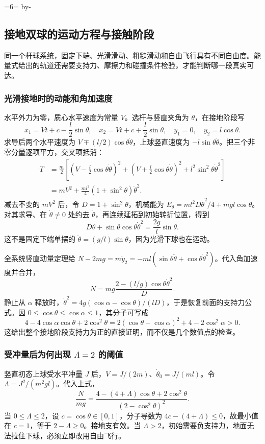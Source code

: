 \documentclass[UTF8,zihao=-4,fontset=fandol,a4paper]{ctexart}
\makeatletter
\newcommand{\Needspace}[1]{\par\if@nobreak\else\penalty0\begingroup\dimen0=#1\relax\dimen2=\pagegoal\advance\dimen2 by-\pagetotal\ifdim\dimen0>\dimen2\newpage\fi\endgroup\fi}
\let\SavedSubsection\subsection
\renewcommand{\subsection}{\Needspace{6\baselineskip}\SavedSubsection}
\makeatother
\begin{document}
\subsection{接地双球的运动方程与接触阶段}\label{sub:c2-4.7}\label{topic:contactdetail}
同一个杆球系统，固定下端、光滑滑动、粗糙滑动和自由飞行具有不同自由度。能量式给出的轨道还需要支持力、摩擦力和碰撞条件检验，才能判断哪一段真实可达。

\subsubsection*{光滑接地时的动能和角加速度}
水平外力为零，质心水平速度为常量 $V$。选杆与竖直夹角为 $\theta$，在接地阶段写
\[
x_1=Vt+c-\frac l2\sin\theta,\quad
x_2=Vt+c+\frac l2\sin\theta,\quad
y_1=0,\quad y_2=l\cos\theta.
\]
求导后两个水平速度为 $V\mp(l/2)\cos\theta\dot\theta$，上球竖直速度为 $-l\sin\theta\dot\theta$。把三个非零分量逐项平方，交叉项抵消：
\begin{align*}
T&=\frac m2\left[(V-\tfrac l2\cos\theta\dot\theta)^2
+(V+\tfrac l2\cos\theta\dot\theta)^2
+l^2\sin^2\theta\dot\theta^2\right]\\
&=mV^2+\frac{ml^2}{4}(1+\sin^2\theta)\dot\theta^2.
\end{align*}
减去不变的 $mV^2$ 后，令 $D=1+\sin^2\theta$，机械能为
$E_\theta=ml^2D\dot\theta^2/4+mgl\cos\theta$。对其求导、在 $\dot\theta\ne0$ 处约去 $\dot\theta$，再连续延拓到初始转折位置，得到
\[
D\ddot\theta+\sin\theta\cos\theta\dot\theta^2
=\frac{2g}{l}\sin\theta.
\]
这不是固定下端单摆的 $\ddot\theta=(g/l)\sin\theta$，因为光滑下球也在运动。

全系统竖直动量定理给
$N-2mg=m\ddot y_2=-ml(\sin\theta\ddot\theta+\cos\theta\dot\theta^2)$。代入角加速度并合并，
\[
N=mg\frac{2-(l/g)\cos\theta\dot\theta^2}{D}.
\]
静止从 $\alpha$ 释放时，$\dot\theta^2=4g(\cos\alpha-\cos\theta)/(lD)$，于是恢复前面的支持力公式。因 $0\le\cos\theta\le\cos\alpha\le1$，其分子可写成
\[
4-4\cos\alpha\cos\theta+2\cos^2\theta
=2(\cos\theta-\cos\alpha)^2+4-2\cos^2\alpha>0.
\]
这给出整个接地阶段支持力为正的直接证明，而不仅是几个数值点的检查。

\subsubsection*{受冲量后为何出现 $\Lambda=2$ 的阈值}
竖直初态上球受水平冲量 $J$ 后，$V=J/(2m)$、$\dot\theta_0=J/(ml)$。令 $\Lambda=J^2/(m^2gl)$。代入上式，
\[
\frac N{mg}=\frac{4-(4+\Lambda)\cos\theta+2\cos^2\theta}{(2-\cos^2\theta)^2}.
\]
当 $0\le\Lambda\le2$，设 $c=\cos\theta\in[0,1]$，分子导数为 $4c-(4+\Lambda)\le0$，故最小值在 $c=1$，等于 $2-\Lambda\ge0$。接地支有效。当 $\Lambda>2$，初始需要负支持力，地面无法拉住下球，必须立即改用自由飞行。
\end{document}
